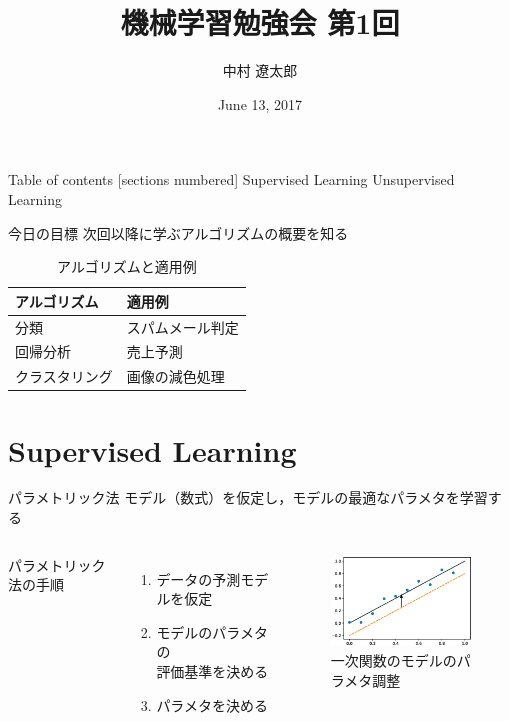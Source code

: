 \documentclass[dvipdfmx,platex]{beamer}
\title{{\mgfamily 機械学習勉強会 第1回}}
\date{June 13, 2017}
\author{{\mgfamily 中村 遼太郎}}
\institute{}
\begin{document}
\mgfamily
\maketitle
\begin{frame}{Table of contents}
  [sections numbered]
  Supervised Learning
  \tableofcontents[part=1]
  Unsupervised Learning
  \tableofcontents[part=2]
\end{frame}
\begin{frame}[fragile]{{\mgfamily 今日の目標}}
  次回以降に学ぶアルゴリズムの概要を知る
  \begin{table}
    \caption{{\mgfamily アルゴリズムと適用例}}    
    \begin{tabular}{@{} ll @{}}
      \toprule
      アルゴリズム & 適用例\\
      \midrule
      分類 & スパムメール判定\\
      回帰分析 & 売上予測\\
      クラスタリング & 画像の減色処理\\
      \bottomrule
    \end{tabular}
  \end{table}
\end{frame}
\part{Supervised Learning}
\begin{frame}{{\mgfamily パラメトリック法}}
  モデル（数式）を仮定し，モデルの最適なパラメタを学習する  
  \vspace{20pt}
  \begin{columns}[T,onlytextwidth]
    パラメトリック法の手順
    \begin{enumerate}
    \item データの予測モデルを仮定
    \item モデルのパラメタの\\評価基準を決める
    \item パラメタを決める
    \end{enumerate}
    \begin{figure}
      \centering
      \includegraphics[width=5cm]{fig/arrange_params.eps}
      \caption{{\mgfamily 一次関数のモデルのパラメタ調整}}
    \end{figure}
  \end{columns}
\end{frame}
\end{document}
